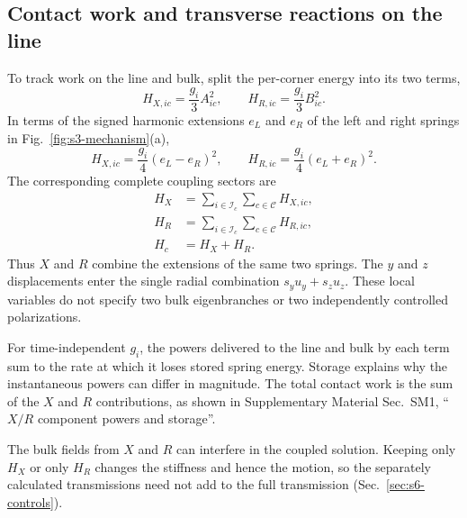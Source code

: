 \documentclass[10pt,aps,onecolumn,floatfix,notitlepage,nofootinbib,showkeys]{revtex4-2}
\newcommand{\Ic}{\mathcal I_c}
\newcommand{\Cc}{\mathcal C}
\begin{document}
\subsection{Contact work and transverse reactions on the line}
\label{sec:s3-XR-work}

To track work on the line and bulk, split the per-corner energy into its two terms,
\begin{equation}
  H_{X,ic}=\frac{g_i}{3}A_{ic}^2,
  \qquad
  H_{R,ic}=\frac{g_i}{3}B_{ic}^2.
  \label{eq:s3-XR-energies}
\end{equation}
In terms of the signed harmonic extensions $e_L$ and $e_R$ of the left and right springs in Fig.~\ref{fig:s3-mechanism}(a),
\begin{equation}
  H_{X,ic}=\frac{g_i}{4}(e_L-e_R)^2,
  \qquad
  H_{R,ic}=\frac{g_i}{4}(e_L+e_R)^2.
  \label{eq:s3-XR-physical-springs}
\end{equation}
The corresponding complete coupling sectors are
\begin{equation}
\begin{aligned}
 H_X&=\sum_{i\in\Ic}\sum_{c\in\Cc}H_{X,ic},\\
 H_R&=\sum_{i\in\Ic}\sum_{c\in\Cc}H_{R,ic},\\
 H_c&=H_X+H_R.
\end{aligned}
 \label{eq:s3-XR-global}
\end{equation}
Thus $X$ and $R$ combine the extensions of the same two springs. The $y$ and $z$ displacements enter the single radial combination $s_yu_y+s_zu_z$. These local variables do not specify two bulk eigenbranches or two independently controlled polarizations.

For time-independent $g_i$, the powers delivered to the line and bulk by each term sum to the rate at which it loses stored spring energy. Storage explains why the instantaneous powers can differ in magnitude. The total contact work is the sum of the $X$ and $R$ contributions, as shown in Supplementary Material Sec.~SM1, ``$X/R$ component powers and storage''.

The bulk fields from $X$ and $R$ can interfere in the coupled solution. Keeping only $H_X$ or only $H_R$ changes the stiffness and hence the motion, so the separately calculated transmissions need not add to the full transmission (Sec.~\ref{sec:s6-controls}).
\end{document}
